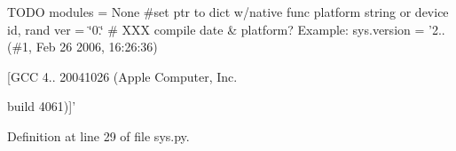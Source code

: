 T\-O\-D\-O modules = None \#set ptr to dict w/native func platform string or device id, rand ver = \char`\"{}0.\char`\"{} \# X\-X\-X compile date \& platform? Example\-: sys.\-version = '2.. (\#1, Feb 26 2006, 16\-:26\-:36) \par
\mbox{[}G\-C\-C 4.. 20041026 (Apple Computer, Inc. 

build 4061)\mbox{]}' 

Definition at line 29 of file sys.\-py.

